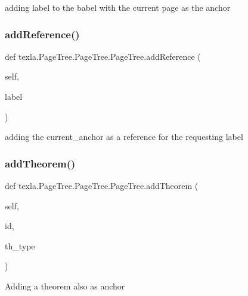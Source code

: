 \begin{DoxyVerb}adding label to the babel with the current
page as the anchor\end{DoxyVerb}
 \hypertarget{classtexla_1_1PageTree_1_1PageTree_1_1PageTree_ac5f3e4e6283924a193a513b2d9289c27}{}\label{classtexla_1_1PageTree_1_1PageTree_1_1PageTree_ac5f3e4e6283924a193a513b2d9289c27} 
\subsubsection{\texorpdfstring{add\+Reference()}{addReference()}}
{\footnotesize\ttfamily def texla.\+Page\+Tree.\+Page\+Tree.\+Page\+Tree.\+add\+Reference (\begin{DoxyParamCaption}\item[{}]{self,  }\item[{}]{label }\end{DoxyParamCaption})}

\begin{DoxyVerb}adding the current_anchor as a reference for the
requesting label\end{DoxyVerb}
 \hypertarget{classtexla_1_1PageTree_1_1PageTree_1_1PageTree_ab34f6b054c920675e93f6e29694d54bf}{}\label{classtexla_1_1PageTree_1_1PageTree_1_1PageTree_ab34f6b054c920675e93f6e29694d54bf} 
\subsubsection{\texorpdfstring{add\+Theorem()}{addTheorem()}}
{\footnotesize\ttfamily def texla.\+Page\+Tree.\+Page\+Tree.\+Page\+Tree.\+add\+Theorem (\begin{DoxyParamCaption}\item[{}]{self,  }\item[{}]{id,  }\item[{}]{th\+\_\+type }\end{DoxyParamCaption})}

\begin{DoxyVerb}Adding a theorem also as anchor\end{DoxyVerb}
 \hypertarget{classtexla_1_1PageTree_1_1PageTree_1_1PageTree_aef29edcb58ecab6f73b2fc00105bfd32}{}\label{classtexla_1_1PageTree_1_1PageTree_1_1PageTree_aef29edcb58ecab6f73b2fc00105bfd32} 
